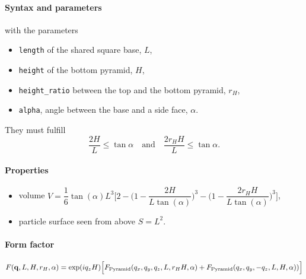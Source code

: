 \FloatBarrier

\paragraph{Syntax and parameters}
\begin{quote}
\end{quote}
with the parameters
\begin{itemize}
\item \texttt{length} of the shared square base, $L$,
\item \texttt{height} of the bottom pyramid, $H$,
\item \texttt{height\_ratio} between the top and the bottom pyramid, $r_H$,
\item \texttt{alpha}, angle between the base and a side face, $\alpha$.
\end{itemize}
They must fulfill
\begin{displaymath}
  \dfrac{2H}{L}\le\tan\alpha\quad\text{and}\quad\dfrac{2r_HH}{L}\le\tan\alpha.
\end{displaymath}

\paragraph{Properties}
\begin{itemize}
\item volume $ V= \dfrac{1}{6} \tan(\alpha)L^3 \Big[ 2
         - \Big(1 - \dfrac{2H }{L\tan(\alpha)} \Big)^3
           - \Big(1 - \dfrac{2 r_H
             H}{L\tan(\alpha) }\Big)^3\Big]$,
\item particle surface seen from above $S =L^2$.
\end{itemize}

\paragraph{Form factor}
\begin{equation*}
F(\mathbf{q}, L, H, r_H, \alpha)=\exp(iq_z
H)\Big[F_{\rm{Pyramid}}(q_x,q_y, q_z, L, r_H H,
\alpha)+F_{\rm{Pyramid}}(q_x, q_y, -q_z, L, H, \alpha))\Big]
\end{equation*}


